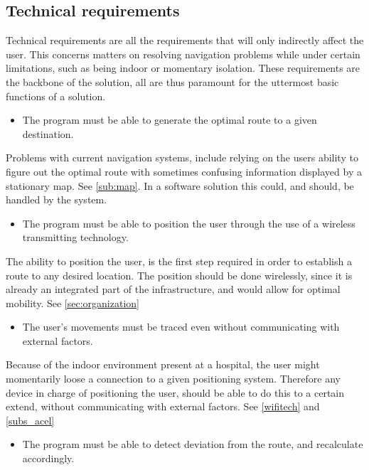 \subsection{Technical requirements}

Technical requirements are all the requirements that will only indirectly affect the user. This concerns matters on resolving navigation problems while under certain limitations, such as being indoor or momentary isolation. These requirements are the backbone of the solution, all are thus paramount for the uttermost basic functions of a solution.

\begin{itemize}
	\item The program must be able to generate the optimal route to a given destination.
\end{itemize}

Problems with current navigation systems, include relying on the users ability to figure out the optimal route with sometimes confusing information displayed by a stationary map. See \cref{sub:map}. In a software solution this could, and should, be handled by the system.

\begin{itemize}
	\item The program must be able to position the user through the use of a wireless transmitting technology.
\end{itemize}

The ability to position the user, is the first step required in order to establish a route to any desired location. The position should be done wirelessly, since it is already an integrated part of the infrastructure, and would allow for optimal mobility. See \cref{sec:organization}

\begin{itemize}
	\item The user's movements must be traced even without communicating with external factors.
\end{itemize}

Because of the indoor environment present at a hospital, the user might momentarily loose a connection to a given positioning system. Therefore any device in charge of positioning the user, should be able to do this to a certain extend, without communicating with external factors. See \cref{wifitech} and \cref{subs_acel}

\begin{itemize}
	\item The program must be able to detect deviation from the route, and recalculate accordingly.
\end{itemize}

